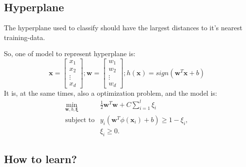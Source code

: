 \documentclass{article}
\begin{document}
\subsection{Hyperplane}
\label{sec:svm:hyperplane}

The hyperplane used to classify should have the largest distances to it's nearest training-data.

So, one of model to represent hyperplane is:
$$
\mathbf{x} = \left[\begin{array}{c} x_1 \\ x_2 \\ \vdots \\ x_d \end{array}\right];
\mathbf{w} = \left[\begin{array}{c} w_1 \\ w_2 \\ \vdots \\ w_d \end{array}\right];
h(\mathbf{x}) = sign\left(\mathbf{w}^T\mathbf{x}+b\right)
$$
It is, at the same times, also a optimization problem, and the model\cite{svm1} is:
\begin{equation}
\label{eq:hyp:op}
\begin{array}{rl}
  \min\limits_{\mathbf{w},b,\mathbf{\xi}} & \frac{1}{2}\mathbf{w}^T\mathbf{w}+C\sum\limits_{i=1}^{l}\xi_i\\
  \text{subject to} & y_i\left(\mathbf{w}^T\phi(\mathbf{x}_i)+b\right) \geq 1 - \xi_i,\\
                                          & \xi_i \geq 0.
\end{array}
\end{equation}

\subsection{How to learn?}
\label{sec:svm:how}
\end{document}
